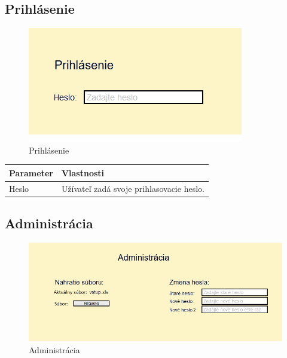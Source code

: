 \documentclass[12pt,a4paper]{report}
\begin{document}
\subsection[Prihlásenie]{\rmfamily\bfseries
	Prihlásenie}

\begin{figure}[htb]
	\centering
	\includegraphics[scale=0.6]{prihlasenie}
	\caption{Prihlásenie}
	\label{fig:Prihlásenie}
\end{figure}


\begin{table}[h!]
	\centering
	\begin{tabular}{|>{\centering\arraybackslash}m{3in}|>{\centering\arraybackslash}m{3in}|}
		\hline
		\centering Parameter & Vlastnosti \\ [0ex]
		\hline
		Heslo & Užívateľ zadá svoje prihlasovacie heslo. \\ [0ex]
		\hline
	\end{tabular}
\end{table}
\FloatBarrier
\subsection[Administrácia]{\rmfamily\bfseries
	Administrácia}

\begin{figure}[!h]
	\centering
	\includegraphics[scale=0.7]{admin}
	\caption{Administrácia}
	\label{fig:Administrácia}
\end{figure}
\end{document}
